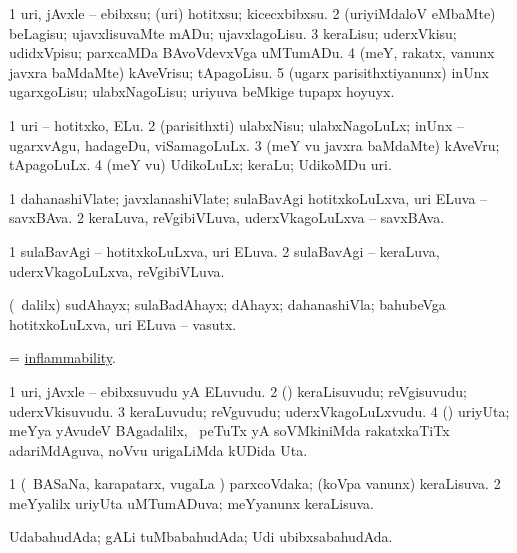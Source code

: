 \bentry
{}
\gl{\sakirx}
\bmng
\bnum
\num{1} uri, jAvxle -- ebibxsu; (uri) hotitxsu; kicecxbibxsu. 
\num{2} (uriyiMdaloV eMbaMte) beLagisu; ujavxlisuvaMte mADu; ujavxlagoLisu. 
\num{3} keraLisu; uderxVkisu; udidxVpisu; parxcaMDa BAvoVdevxVga uMTumADu. 
\num{4} (meY, rakatx, \mo vanunx javxra baMdaMte) kAveVrisu; tApagoLisu. 
\num{5} (ugarx parisithxtiyanunx) inUnx ugarxgoLisu; ulabxNagoLisu; uriyuva beMkige tupapx hoyuyx. 
\enum
\emng

\noindent
\gl{\akirx}
\bmng
\bnum
\num{1} uri -- hotitxko, ELu. 
\num{2} (parisithxti) ulabxNisu; ulabxNagoLuLx; inUnx -- ugarxvAgu, hadageDu, viSamagoLuLx. 
\num{3} (meY \mo vu javxra baMdaMte) kAveVru; tApagoLuLx. 
\num{4} (meY \mo vu) UdikoLuLx; keraLu; UdikoMDu uri. 
\enum
\emng
\eentry

\bentry
{}
\gl{\nA}
\bmng
\bnum
\num{1} dahanashiVlate; javxlanashiVlate; sulaBavAgi hotitxkoLuLxva, uri ELuva -- savxBAva. 
\num{2} keraLuva, reVgibiVLuva, uderxVkagoLuLxva -- savxBAva. 
\enum
\emng
\eentry

\bentry
{}
\gl{\gu}
\bmng
\bnum
\num{1} sulaBavAgi -- hotitxkoLuLxva, uri ELuva. 
\num{2} sulaBavAgi -- keraLuva, uderxVkagoLuLxva, reVgibiVLuva. 
\enum
\emng
\eentry

\bentry
{}
\gl{\nA}
\bmng
(\sA\ \bava dalilx) sudAhayx; sulaBadAhayx; dAhayx; dahanashiVla; bahubeVga hotitxkoLuLxva, uri ELuva -- vasutx. 
\emng
\eentry

\bentry
{}
\gl{\nA}
\bmng
 = \hyperlink{inflammability}{inflammability}. 
\emng
\eentry

\bentry
{}
\gl{\nA}
\bmng
\bnum
\num{1} uri, jAvxle -- ebibxsuvudu yA ELuvudu. 
\num{2} (\rUpa) keraLisuvudu; reVgisuvudu; uderxVkisuvudu. 
\num{3} keraLuvudu; reVguvudu; uderxVkagoLuLxvudu. 
\num{4} (\roVshA) uriyUta; meYya yAvudeV BAgadalilx, \kanmu\ peTuTx yA soVMkiniMda rakatxkaTiTx adariMdAguva, noVvu urigaLiMda kUDida Uta. 
\enum
\emng
\eentry

\bentry
{}
\gl{\gu}
\bmng
\bnum
\num{1} (\kanmu\ BASaNa, karapatarx, \mo vugaLa \vi) parxcoVdaka; (koVpa \mo vanunx) keraLisuva. 
\num{2} meYyalilx uriyUta uMTumADuva; meYyanunx keraLisuva. 
\enum
\emng
\eentry

\bentry
{}
\gl{\gu}
\bmng
UdabahudAda; gALi tuMbabahudAda; Udi ubibxsabahudAda. 
\emng
\eentry

